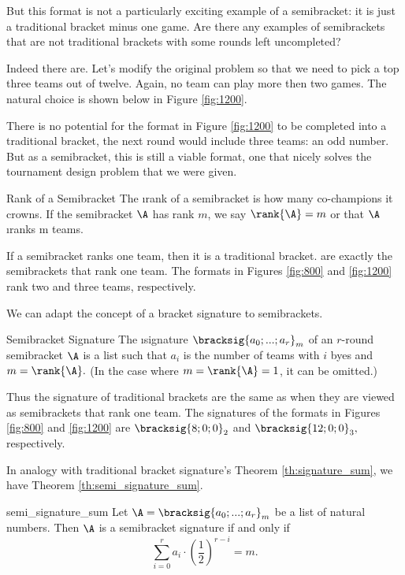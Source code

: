 {    But this format is not a particularly exciting example of a semibracket: it is just a traditional bracket minus one game. Are there any examples of semibrackets that are not traditional brackets with some rounds left uncompleted?

    Indeed there are. Let's modify the original problem so that we need to pick a top three teams out of twelve. Again, no team can play more then two games. The natural choice is shown below in Figure \ref{fig:1200}.
    

    There is no potential for the format in Figure \ref{fig:1200} to be completed into a traditional bracket, the next round would include three teams: an odd number. But as a semibracket, this is still a viable format, one that nicely solves the tournament design problem that we were given.
    
    \begin{definition}{Rank of a Semibracket}{}
        The \i{rank} of a semibracket is how many co-champions it crowns. If the semibracket $\A$ has rank $m$, we say $\rank{\A} = m$ or that $\A$ \i{ranks m teams}.
    \end{definition}

    If a semibracket ranks one team, then it is a traditional bracket. are exactly the semibrackets that rank one team. The formats in Figures \ref{fig:800} and \ref{fig:1200} rank two and three teams, respectively.

    We can adapt the concept of a bracket signature to semibrackets.

    \begin{definition}{Semibracket Signature}{}
        The \i{signature} $\bracksig{a_0; ...; a_r}_m$ of an $r$-round semibracket $\A$ is a list such that $a_i$ is the number of teams with $i$ byes and $m = \rank{\A}.$ (In the case where $m = \rank{\A} = 1$, it can be omitted.)
    \end{definition}

    Thus the signature of traditional brackets are the same as when they are viewed as semibrackets that rank one team. The signatures of the formats in Figures \ref{fig:800} and \ref{fig:1200} are $\bracksig{8;0;0}_2$ and $\bracksig{12;0;0}_3,$ respectively.

    In analogy with traditional bracket signature's Theorem \ref{th:signature_sum}, we have Theorem \ref{th:semi_signature_sum}.

    \begin{theorem}{}{semi_signature_sum}
        Let $\A = \bracksig{a_0; ...; a_r}_m$ be a list of natural numbers. Then $\A$ is a semibracket signature if and only if $$\sum_{i=0}^r a_i \cdot \left(\frac{1}{2}\right)^{r - i} = m.$$
    \end{theorem}

}
